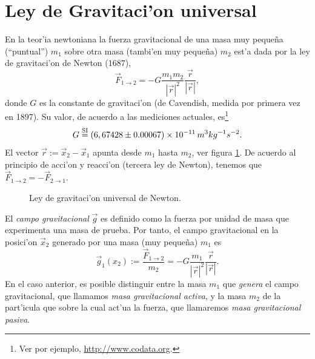 \section{Ley de Gravitaci'on universal}
En la teor'ia newtoniana la fuerza gravitacional de una masa muy peque\~na (``puntual'') $m_1$ sobre otra masa (tambi'en muy peque\~na) $m_2$
est'a dada por la ley de gravitaci'on de Newton ($1687$),
\begin{equation}
\vec{F}_{1\rightarrow 2}=-G\frac{m_1m_2}{|\vec{r}|^2}\frac{\vec{r}}{|\vec{r}|},
\end{equation}
donde $G$ es la constante de gravitaci'on (de Cavendish, medida por primera vez en 1897). Su valor, de acuerdo a las mediciones actuales, es\footnote{Ver por ejemplo, \url{http://www.codata.org}.}
\begin{equation}
G\stackrel{\rm SI}{=}(6,674 28\pm 0.000 67)\times 10^{-11}\, m^3kg^{-1}s^{-2}.
\end{equation}
El vector $\vec{r}:=\vec{x}_2-\vec{x}_1$ apunta desde $m_1$ hasta $m_2$, ver figura \ref{lguN}. De acuerdo al principio de acci'on y reacci'on (tercera ley de Newton),
tenemos que $\vec{F}_{1\rightarrow 2}=-\vec{F}_{2\rightarrow 1}$.
\begin{center}
\begin{figure}[H]
\centerline{}
\caption{Ley de gravitaci'on universal de Newton.}
\label{lguN}
\end{figure}
\end{center}
El \textit{campo gravitacional} $\vec{g}$ es definido como la fuerza por unidad de masa
que experimenta una masa de prueba. Por tanto, el campo gravitacional en la posici'on $\vec{x}_2$ generado por una masa (muy peque\~na) $m_1$ es
\begin{equation}
\vec{g}_1(x_2):=\frac{\vec{F}_{1\to 2}}{m_2}=-G\frac{m_1}{|\vec{r}|^2}\frac{\vec{r}}{|\vec{r}|}.
\end{equation}
En el caso anterior, es posible distinguir entre la masa $m_1$ que
\textit{genera} el campo gravitacional, que llamamos \textit{masa gravitacional
activa}, y la masa $m_2$ de la part'icula que sobre la cual act'ua la fuerza, que
llamaremos \textit{masa gravitacional pasiva}.


